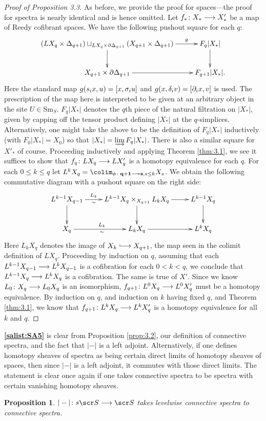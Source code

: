 \documentclass{amsart}
\newtheorem{prop}[thm]{Proposition}
\theoremstyle{definition}
\begin{document}
\begin{proof}[Proof of Proposition 3.3] As before, we provide the proof for spaces---the proof for spectra is nearly identical and is hence omitted. Let $f_* \colon X_* \longrightarrow X'_*$ be a map of Reedy cofibrant spaces. We have the following pushout square for each $q$:
\[
\xymatrix{
(LX_q \times \DE_{q+1}) \sqcup_{LX_q \times \pa \DE_{q+1}} (X_{q+1} \times \DE_{q+1}) \ar[r]^-g \ar[d] & F_q|X_*| \ar[d]\\
X_{q+1} \times \pa \DE_{q+1} \ar[r] & F_{q+1}|X_*|.
}
\]
\noindent Here the standard map $g(s_i x, u) = [x,\sigma_i u]$ and $g(x,\delta_i v) = [\partial_i x, v]$ is used. The prescription of the map here is interpreted to be given at an arbitrary object in the site $U \in \mathrm{Sm}_S$. $F_q|X_*|$ denotes the $q$th piece of the natural filtration on $|X_*|$, given by capping off the tensor product defining $|X_*|$ at the $q$-simplices. Alternatively, one might take the above to be the definition of $F_q|X_*|$ inductively (with $F_0|X_*|=X_0$) so that $|X_*| = \varinjlim F_q |X_*|$. There is also a similar square for $X'_*$ of course. Proceeding inductively and applying Theorem \ref{thm:3.1}, we see it suffices to show that $f_q \colon LX_q \longrightarrow LX'_q$ is a homotopy equivalence for each $q$. For each $0 \leq k \leq q$ let $L^k X_q = \colim_{\phi \colon \mathbf{q+1} \epito \mathbf{s}, s \leq k} X_s$. We obtain the following commutative diagram with a pushout square on the right side: \[\xymatrix{
L^{k-1} X_{q-1} \ar[d] \ar[r]^-{L_k}_-{\sim} & L^{k-1}X_{q} \times_{X_{q+1}} L_k X_q \ar[r] \ar[d] & L^{k-1}X_q \ar[d]\\
X_q \ar[r]^{L_k}_{\sim} & L_k X_q \ar[r] & L^k X_q
}\]
\noindent Here $L_k X_q$ denotes the image of $X_k \monoto X_{q+1}$, the map seen in the colimit definition of $LX_q$. Proceeding by induction on $q$, assuming that each $L^{k-1}X_{q-1} \longrightarrow L^{k}X_{q-1}$ is a cofibration for each $0 < k < q$, we conclude that $L^{k-1}X_q \longrightarrow L^{k}X_q$ is a cofibration. The same is true of $X'$. Since we know $L_0 \colon X_q \longrightarrow L_0 X_q$ is an isomorphism, $f_{q+1} \colon L^0 X_q \longrightarrow L^0 X'_q$ must be a homotopy equivalence. By induction on $q$, and induction on $k$ having fixed $q$, and Theorem \ref{thm:3.1}, we know that $f_{q+1} \colon L^k X_q \longrightarrow L^k X'_q$ is a homotopy equivalence for all $k$ and $q$.  %
\end{proof}

\textbf{\ref{salist:SA5}} is clear from Proposition \ref{prop:3.2}, our definition of connective spectra, and the fact that $|-|$ is a left adjoint. Alternatively, if one defines homotopy sheaves of spectra as being certain direct limits of homotopy sheaves of spaces, then since $|-|$ is a left adjoint, it commutes with those direct limits. The statement is clear once again if one takes connective spectra to be spectra with certain vanishing homotopy sheaves. 
\begin{prop}
$|-| \colon s\sS \rtarr \sS$ takes levelwise connective spectra to connective spectra.
\end{prop}
\end{document}
